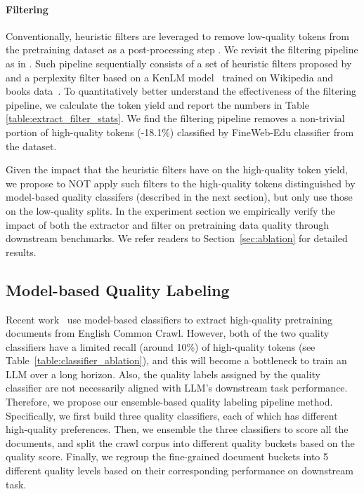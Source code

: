 \documentclass[11pt]{article}
\begin{document}
\paragraph{Filtering} Conventionally, heuristic filters are leveraged to remove low-quality tokens from the pretraining dataset as a post-processing step \citep{li2024datacomp,parmar2024data,penedo2024fineweb,dubey2024llama}. We revisit the filtering pipeline as in \citep{parmar2024data}. Such pipeline sequentially consists of a set of heuristic filters proposed by \citet{raffel2020exploring,rae2021scaling} and a perplexity filter based on a KenLM model~\citep{heafield2011kenlm} trained on Wikipedia and books data~\citep{wenzek-etal-2020-ccnet}. To quantitatively better understand the effectiveness of the filtering pipeline, we calculate the token yield and report the numbers in Table \ref{table:extract_filter_stats}. We find the filtering pipeline removes a non-trivial portion of high-quality tokens (-18.1\%) classified by FineWeb-Edu classifier from the dataset. 

Given the impact that the heuristic filters have on the high-quality token yield, we propose to NOT apply such filters to the high-quality tokens distinguished by model-based quality classifers (described in the next section), but only use those on the low-quality splits. In the experiment section we empirically verify the impact of both the extractor and filter on pretraining data quality through downstream benchmarks. We refer readers to Section~\ref{sec:ablation} for detailed results.

\subsection{Model-based Quality Labeling} \label{sec:classifier}
Recent work~\citep{li2024datacomp,penedo2024fineweb} use model-based classifiers to extract high-quality pretraining documents from English Common Crawl. However, both of the two quality classifiers have a limited recall (around 10\%) of high-quality tokens (see Table~\ref{table:classifier_ablation}), and this will become a bottleneck to train an LLM over a long horizon. Also, the quality labels assigned by the quality classifier are not necessarily aligned with LLM's downstream task performance. Therefore, we propose our ensemble-based quality labeling pipeline method. Specifically, we first build three quality classifiers, each of which has different high-quality preferences. Then, we ensemble the three classifiers to score all the documents, and split the crawl corpus into different quality buckets based on the quality score. Finally, we regroup the fine-grained document buckets into 5 different quality levels based on their corresponding performance on downstream task. 
\end{document}
